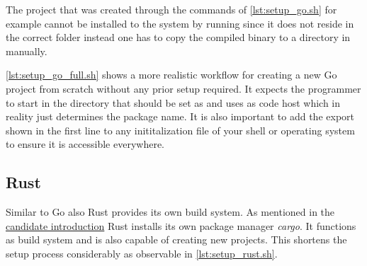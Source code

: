 The project that was created through the commands of \autoref{lst:setup_go.sh} for example cannot be installed to the system by running  since it does not reside in the correct folder instead one has to copy the compiled binary to a directory in  manually.

\autoref{lst:setup_go_full.sh} shows a more realistic workflow for creating a new Go project from scratch without any prior setup required. It expects the programmer to start in the directory that should be set as  and uses \href{https://www.github.com}{} as code host which in reality just determines the package name. It is also important to add the export shown in the first line to any inititalization file of your shell or operating system to ensure it is accessible everywhere.
\\


\subsection{Rust}
\label{subsec:Implementation::Setup::Rust}

Similar to Go also Rust provides its own build system. As mentioned in the \hyperref[subsec:State_of_the_art::Candidates::Rust]{candidate introduction} Rust installs its own package manager \textit{cargo}. It functions as build system and is also capable of creating new projects. This shortens the setup process considerably as observable in \autoref{lst:setup_rust.sh}.
\\


